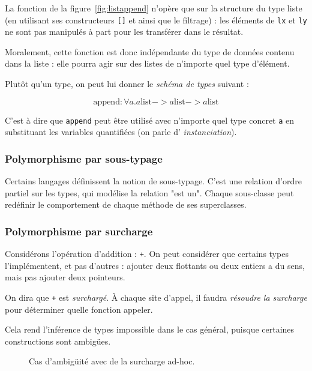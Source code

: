 La fonction de la figure~\ref{fig:listappend} n'opère que sur la structure du type
liste (en utilisant ses constructeurs \texttt{{[}{]}} et \listcons ainsi que
le filtrage) : les éléments de \texttt{lx} et \texttt{ly} ne sont pas manipulés
à part pour les transférer dans le résultat.

Moralement, cette fonction est donc indépendante du type de données contenu dans
la liste : elle pourra agir sur des listes de n'importe quel type d'élément.

Plutôt qu'un type, on peut lui donner le \emph{schéma de types} suivant :

\[
  \textrm{append} : \forall a . a \textrm{list}
                             -> a \textrm{list}
                             -> a \textrm{list}
\]

C'est à dire que \texttt{append} peut être utilisé avec n'importe quel type
concret \texttt{a} en substituant les variables quantifiées (on parle d'
\emph{instanciation}).

\subsubsection{Polymorphisme par sous-typage}


Certains langages définissent la notion de sous-typage. C'est une relation
d'ordre partiel sur les types, qui modélise la relation "est un". Chaque
sous-classe peut redéfinir le comportement de chaque méthode de ses
superclasses.

\subsubsection{Polymorphisme par surcharge}

Considérons l'opération d'addition : \texttt{+}. On peut considérer que certains
types l'implémentent, et pas d'autres : ajouter deux flottants ou deux entiers a
du sens, mais pas ajouter deux pointeurs.

On dira que \texttt{+} est \emph{surchargé}. À chaque site d'appel, il faudra
\emph{résoudre la surcharge} pour déterminer quelle fonction appeler.

Cela rend l'inférence de types 
impossible dans le cas général, puisque certaines constructions sont ambigües.

\begin{figure}
  \caption{Cas d'ambigüité avec de la surcharge ad-hoc.}
  \label{fig:showread}
\end{figure}

